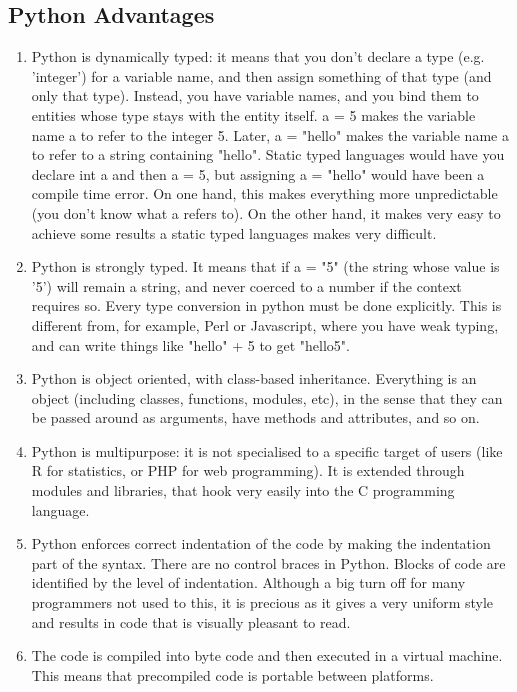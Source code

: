   \subsection{Python Advantages}
    \begin{enumerate}
       \item Python is dynamically typed: it means that you don't declare a type (e.g. 'integer') for a variable name, and then assign something of that type (and only that type). Instead, you have variable names, and you bind them to entities whose type stays with the entity itself. a = 5 makes the variable name a to refer to the integer 5. Later, a = "hello" makes the variable name a to refer to a string containing "hello". Static typed languages would have you declare int a and then a = 5, but assigning a = "hello" would have been a compile time error. On one hand, this makes everything more unpredictable (you don't know what a refers to). On the other hand, it makes very easy to achieve some results a static typed languages makes very difficult.
       \item Python is strongly typed. It means that if a = "5" (the string whose value is '5') will remain a string, and never coerced to a number if the context requires so. Every type conversion in python must be done explicitly. This is different from, for example, Perl or Javascript, where you have weak typing, and can write things like "hello" + 5 to get "hello5".
       \item Python is object oriented, with class-based inheritance. Everything is an object (including classes, functions, modules, etc), in the sense that they can be passed around as arguments, have methods and attributes, and so on.
       \item Python is multipurpose: it is not specialised to a specific target of users (like R for statistics, or PHP for web programming). It is extended through modules and libraries, that hook very easily into the C programming language.
       \item Python enforces correct indentation of the code by making the indentation part of the syntax. There are no control braces in Python. Blocks of code are identified by the level of indentation. Although a big turn off for many programmers not used to this, it is precious as it gives a very uniform style and results in code that is visually pleasant to read.
       \item The code is compiled into byte code and then executed in a virtual machine. This means that precompiled code is portable between platforms.
    \end{enumerate}
    
